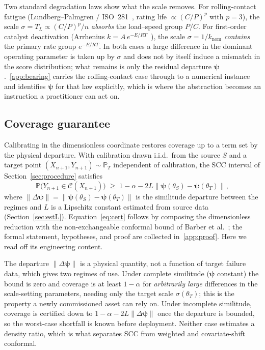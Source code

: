 \documentclass[review,times]{elsarticle}
\theoremstyle{definition}
\theoremstyle{remark}
\begin{document}
Two standard degradation laws show what the scale removes. For rolling-contact fatigue
(Lundberg--Palmgren / ISO~281~\cite{lundberg1947dynamic,iso281}, rating life $\propto(C/P)^p$ with
$p=3$), the scale $\sigma=T_L\propto(C/P)^p/n$ \emph{absorbs} the load--speed group $P/C$. For
first-order catalyst deactivation (Arrhenius $k=A\,e^{-E/RT}$~\cite{levenspiel1999chemical,perry2008handbook}),
the scale $\sigma=1/k_{\mathrm{nom}}$ \emph{contains} the primary rate group $e^{-E/RT}$. In both
cases a large difference in the dominant operating parameter is taken up by $\sigma$ and does not by
itself induce a mismatch in the score distribution; what remains is only the residual departure
$\boldsymbol\psi$.~\ref{app:bearing} carries the rolling-contact case through to a
numerical instance and identifies $\boldsymbol\psi$ for that law explicitly, which is where the abstraction
becomes an instruction a practitioner can act on.

\subsection{Coverage guarantee}\label{sec:guarantee}
Calibrating in the dimensionless coordinate restores coverage up to a term set by the physical
departure. With calibration drawn i.i.d.\ from the source $S$ and a target point
$(X_{n+1},Y_{n+1})\sim\mathbb P_T$ independent of calibration, the SCC interval of
Section~\ref{sec:procedure} satisfies
\begin{equation}\label{eq:cert}
\mathbb P\big(Y_{n+1}\in\mathcal C(X_{n+1})\big)\;\ge\;
1-\alpha-2L\lVert\boldsymbol\psi(\theta_S)-\boldsymbol\psi(\theta_T)\rVert,
\end{equation}
where $\lVert\Delta\boldsymbol\psi\rVert=\lVert\boldsymbol\psi(\theta_S)-\boldsymbol\psi(\theta_T)\rVert$
is the similitude departure between the regimes and $L$ is a Lipschitz constant estimated from source
data (Section~\ref{sec:estL}). Equation~\eqref{eq:cert} follows by composing the dimensionless
reduction with the non-exchangeable conformal bound of Barber et al.~\cite{barber2023conformal}; the
formal statement, hypotheses, and proof are collected in~\ref{app:proof}. Here we read off its
engineering content.

The departure $\lVert\Delta\boldsymbol\psi\rVert$ is a physical quantity, not a function of target
failure data, which gives two regimes of use. Under complete similitude ($\boldsymbol\psi$ constant)
the bound is zero and coverage is at least $1-\alpha$ for \emph{arbitrarily large} differences in the
scale-setting parameters, needing only the target scale $\sigma(\theta_T)$; this is the property a
newly commissioned asset can rely on. Under incomplete similitude, coverage is certified down to
$1-\alpha-2L\lVert\Delta\boldsymbol\psi\rVert$ once the departure is bounded, so the worst-case
shortfall is known before deployment. Neither case estimates a density ratio, which is what separates
SCC from weighted and covariate-shift conformal.
\end{document}
